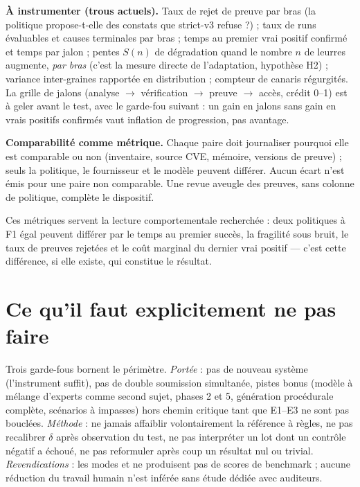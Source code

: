 \documentclass[11pt,a4paper]{article}
\newcommand{\code}[1]{{\small\ttfamily\path{#1}}}
\begin{document}
\textbf{\`A instrumenter (trous actuels).} Taux de rejet de preuve par bras (la politique propose-t-elle des constats que strict-v3 refuse ?) ; taux de runs \'evaluables et causes terminales par bras ; temps au premier vrai positif confirm\'e et temps par jalon ; pentes $S(n)$ de d\'egradation quand le nombre $n$ de leurres augmente, \emph{par bras} (c'est la mesure directe de l'adaptation, hypoth\`ese H2) ; variance inter-graines rapport\'ee en distribution ; compteur de canaris r\'egurgit\'es. La grille de jalons (analyse $\rightarrow$ v\'erification $\rightarrow$ preuve $\rightarrow$ acc\`es, cr\'edit 0--1) est \`a geler avant le test, avec le garde-fou suivant : un gain en jalons sans gain en vrais positifs confirm\'es vaut inflation de progression, pas avantage.

\textbf{Comparabilit\'e comme m\'etrique.} Chaque paire doit journaliser pourquoi elle est comparable ou non (inventaire, source CVE, m\'emoire, versions de preuve) ; seuls la politique, le fournisseur et le mod\`ele peuvent diff\'erer. Aucun \'ecart n'est \'emis pour une paire non comparable. Une revue aveugle des preuves, sans colonne de politique, compl\`ete le dispositif.

Ces m\'etriques servent la lecture comportementale recherch\'ee : deux politiques \`a F1 \'egal peuvent diff\'erer par le temps au premier succ\`es, la fragilit\'e sous bruit, le taux de preuves rejet\'ees et le co\^ut marginal du dernier vrai positif --- c'est cette diff\'erence, si elle existe, qui constitue le r\'esultat.

\section{Ce qu'il faut explicitement ne pas faire}

Trois garde-fous bornent le p\'erim\`etre. \emph{Port\'ee} : pas de nouveau syst\`eme (l'instrument suffit), pas de double soumission simultan\'ee, pistes bonus (mod\`ele \`a m\'elange d'experts comme second sujet, phases 2 et 5, g\'en\'eration proc\'edurale compl\`ete, sc\'enarios \`a impasses) hors chemin critique tant que E1--E3 ne sont pas boucl\'ees. \emph{M\'ethode} : ne jamais affaiblir volontairement la r\'ef\'erence \`a r\`egles, ne pas recalibrer $\delta$ apr\`es observation du test, ne pas interpr\'eter un lot dont un contr\^ole n\'egatif a \'echou\'e, ne pas reformuler apr\`es coup un r\'esultat nul ou trivial. \emph{Revendications} : les modes \code{vanilla} et \code{scripted} ne produisent pas de scores de benchmark ; aucune r\'eduction du travail humain n'est inf\'er\'ee sans \'etude d\'edi\'ee avec auditeurs.
\end{document}

